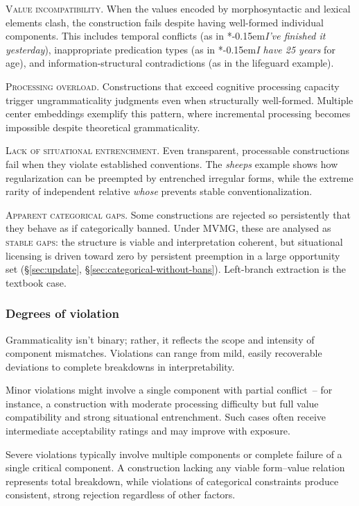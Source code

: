 \documentclass[12pt,letterpaper]{article}
\newcommand{\term}[1]{\textsc{#1}}
\newcommand{\mention}[1]{\textit{#1}}
\newcommand{\judgesep}{\kern-0.15em}
\newcommand{\ungram}[1]{*\judgesep#1}
\begin{document}
\textsc{Value incompatibility.}
When the values encoded by morphosyntactic and lexical elements clash, the construction fails despite having well-formed individual components. This includes temporal conflicts (as in \ungram{\mention{I've finished it yesterday}}), inappropriate predication types (as in \ungram{\mention{I have 25 years}} for age), and information-structural contradictions (as in the lifeguard example).

\textsc{Processing overload.}\label{sec:processing}
Constructions that exceed cognitive processing capacity trigger ungrammaticality judgments even when structurally well-formed. Multiple center embeddings exemplify this pattern, where incremental processing becomes impossible despite theoretical grammaticality.

\textsc{Lack of situational entrenchment.}
Even transparent, processable constructions fail when they violate established conventions. The \mention{sheeps} example shows how regularization can be preempted by entrenched irregular forms, while the extreme rarity of independent relative \mention{whose} prevents stable conventionalization.

\textsc{Apparent categorical gaps.}\label{sec:stable-gaps}
Some constructions are rejected so persistently that they behave as if categorically banned. Under MVMG, these are analysed as \term{stable gaps}: the structure is viable and interpretation coherent, but situational licensing is driven toward zero by persistent preemption in a large opportunity set (\S\ref{sec:update}, \S\ref{sec:categorical-without-bans}). Left-branch extraction is the textbook case.

\subsubsection{Degrees of violation}\label{sec:degrees}

Grammaticality isn't binary; rather, it reflects the scope and intensity of component mismatches. Violations can range from mild, easily recoverable deviations to complete breakdowns in interpretability.

Minor violations might involve a single component with partial conflict~-- for instance, a construction with moderate processing difficulty but full value compatibility and strong situational entrenchment. Such cases often receive intermediate acceptability ratings and may improve with exposure.

Severe violations typically involve multiple components or complete failure of a single critical component. A construction lacking any viable form--value relation represents total breakdown, while violations of categorical constraints produce consistent, strong rejection regardless of other factors.
\end{document}
